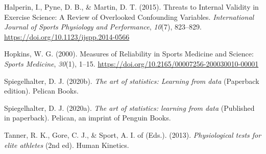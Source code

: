 \documentclass[
  letterpaper,
  DIV=11,
  numbers=noendperiod]{scrartcl}
\newlength{\cslhangindent}
\newlength{\cslentryspacingunit} %
\newenvironment{CSLReferences}[2] %
 {%
  \setlength{\parindent}{0pt}
  \ifodd #1
  \let\oldpar\par
  \def\par{\hangindent=\cslhangindent\oldpar}
  \fi
  \setlength{\parskip}{#2\cslentryspacingunit}
 }%
 {}
\begin{document}
\hypertarget{refs}{}
\begin{CSLReferences}{1}{0}
\leavevmode{}%
Halperin, I., Pyne, D. B., \& Martin, D. T. (2015). Threats to
{Internal} {Validity} in {Exercise} {Science}: {A} {Review} of
{Overlooked} {Confounding} {Variables}. \emph{International Journal of
Sports Physiology and Performance}, \emph{10}(7), 823--829.
\url{https://doi.org/10.1123/ijspp.2014-0566}

\leavevmode{}%
Hopkins, W. G. (2000). Measures of {Reliability} in {Sports} {Medicine}
and {Science}: \emph{Sports Medicine}, \emph{30}(1), 1--15.
\url{https://doi.org/10.2165/00007256-200030010-00001}

\leavevmode{}%
Spiegelhalter, D. J. (2020b). \emph{The art of statistics: Learning from
data} (Paperback edition). Pelican Books.

\leavevmode{}%
Spiegelhalter, D. J. (2020a). \emph{The art of statistics: learning from
data} (Published in paperback). Pelican, an imprint of Penguin Books.

\leavevmode{}%
Tanner, R. K., Gore, C. J., \& Sport, A. I. of (Eds.). (2013).
\emph{Physiological tests for elite athletes} (2nd ed). Human Kinetics.

\end{CSLReferences}
\end{document}
